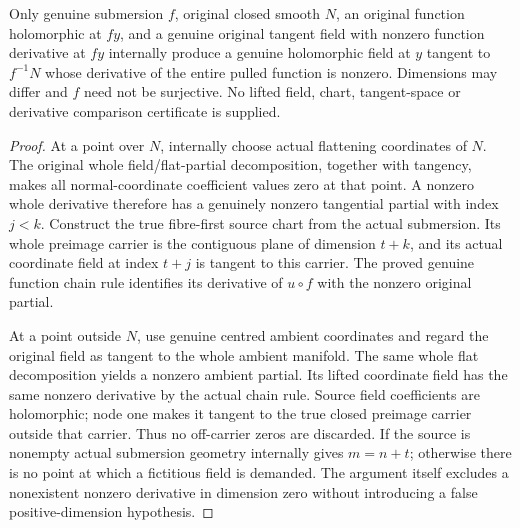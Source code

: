 \begin{lemma}
\label{hir:submersion-tangent-contact-nonzero-field-lift}
\leanok
Only genuine submersion $f$, original closed smooth $N$, an original function
holomorphic at $fy$, and a genuine original tangent field with nonzero
function derivative at $fy$ internally produce a genuine holomorphic field
at $y$ tangent to $f^{-1}N$ whose derivative of the entire pulled function is
nonzero. Dimensions may differ and $f$ need not be surjective. No lifted field,
chart, tangent-space or derivative comparison certificate is supplied.
\end{lemma}
\begin{proof}
At a point over $N$, internally choose actual flattening coordinates of $N$.
The original whole field/flat-partial decomposition, together with tangency,
makes all normal-coordinate coefficient values zero at that point. A nonzero
whole derivative therefore has a genuinely nonzero tangential partial with
index $j<k$. Construct the true fibre-first source chart from the actual
submersion. Its whole preimage carrier is the contiguous plane of dimension
$t+k$, and its actual coordinate field at index $t+j$ is tangent to this
carrier. The proved genuine function chain rule identifies its derivative of
$u\circ f$ with the nonzero original partial.

At a point outside $N$, use genuine centred ambient coordinates and regard
the original field as tangent to the whole ambient manifold. The same whole
flat decomposition yields a nonzero ambient partial. Its lifted coordinate
field has the same nonzero derivative by the actual chain rule. Source field
coefficients are holomorphic; node one makes it tangent to the true closed
preimage carrier outside that carrier. Thus no off-carrier zeros are discarded.
If the source is nonempty actual submersion geometry internally gives
$m=n+t$; otherwise there is no point at which a fictitious field is demanded.
The argument itself excludes a nonexistent nonzero derivative in dimension
zero without introducing a false positive-dimension hypothesis.
\end{proof}


